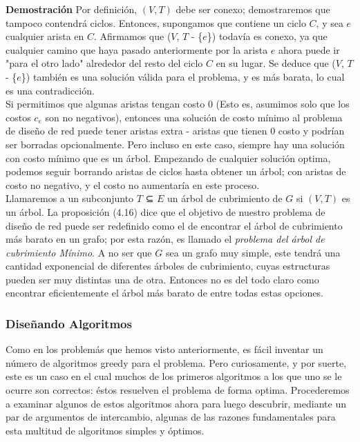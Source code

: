 \documentclass[a4paper]{article}
\begin{document}
\textbf{Demostración} Por definición, $(V,T)$ debe ser conexo; demostraremos que tampoco contendrá ciclos. Entonces, supongamos que contiene un ciclo $C$, y sea $e$ cualquier
arista en $C$. Afirmamos que ($V$, $T$ - \{$e$\}) todavía es conexo, ya que cualquier camino que haya pasado anteriormente por la arista $e$ ahora puede ir "para el otro lado" alrededor del resto
del ciclo $C$ en su lugar. Se deduce que ($V$, $T$ - \{$e$\}) también es una solución válida para el
problema, y es más barata, lo cual es una contradicción.\\

Si permitimos que algunas aristas tengan costo 0 (Esto es, asumimos solo que los costos $c_e$ son no negativos), entonces una solución de costo mínimo al problema de diseño de red puede tener aristas extra -  aristas que tienen 0 costo y podrían ser borradas opcionalmente. Pero incluso en este caso, siempre hay una solución con costo mínimo que es un árbol. Empezando de cualquier solución optima, podemos seguir borrando aristas de ciclos hasta obtener un árbol; con aristas de costo no negativo, y el costo no aumentaría en este proceso.\\
	
Llamaremos a un subconjunto $T$ ⊆ $E$ un árbol de cubrimiento de $G$ si $(V,T)$ es un árbol. La proposición (4.16) dice que el objetivo de nuestro problema de diseño de red puede ser redefinido como el de encontrar el árbol de cubrimiento más barato en un grafo; por esta razón, es llamado el \textit{problema del árbol de cubrimiento Mínimo}. A no ser que $G$ sea un grafo muy simple, este tendrá una cantidad exponencial de diferentes árboles de cubrimiento, cuyas estructuras pueden ser muy distintas una de otra. Entonces no es del todo claro como encontrar eficientemente el árbol más barato de entre todas estas opciones.\\
    
\subsubsection*{Diseñando Algoritmos}
Como en los problemás que hemos visto anteriormente, es fácil inventar un número de algoritmos greedy para el problema. Pero curiosamente, y por suerte, este es un caso en el cual muchos de los primeros algoritmos a los que uno se le ocurre son correctos: éstos resuelven el problema de forma optima. Procederemos a examinar algunos de estos algoritmos ahora para luego descubrir, mediante un par de argumentos de intercambio, algunas de las razones fundamentales para esta multitud de algoritmos simples y óptimos.\\
\end{document}
